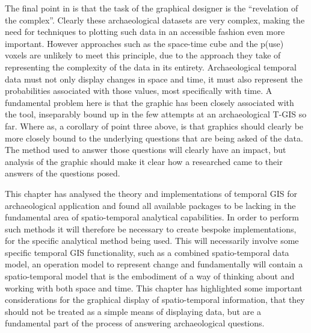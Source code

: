 The final point in \citet[191]{tufte1983visual} is that the task of the graphical designer is the ``revelation of the complex''. Clearly these archaeological datasets are very complex, making the need for techniques to plotting such data in an accessible fashion even more important. However approaches such as the space-time cube and the p(use) voxels are unlikely to meet this principle, due to the approach they take of representing the complexity of the data in its entirety. Archaeological temporal data must not only display changes in space and time, it must also represent the probabilities associated with those values, most specifically with time. A fundamental problem here is that the graphic has been closely associated with the tool, inseparably bound up in the few attempts at an archaeological T-GIS so far. Where as, a corollary of point three above, is that graphics should clearly be more closely bound to the underlying questions that are being asked of the data. The method used to answer those questions will clearly have an impact, but analysis of the graphic should make it clear how a researched came to their answers of the questions posed. 

This chapter has analysed the theory and implementations of temporal GIS for archaeological application and found all available packages to be lacking in the fundamental area of spatio-temporal analytical capabilities. In order to perform such methods it will therefore be necessary to create bespoke implementations, for the specific analytical method being used. This will necessarily involve some specific temporal GIS functionality, such as a combined spatio-temporal data model, an operation model to represent change and fundamentally will contain a spatio-temporal model that is the embodiment of a way of thinking about and working with both space and time. This chapter has highlighted some important considerations for the graphical display of spatio-temporal information, that they should not be treated as a simple means of displaying data, but are a fundamental part of the process of answering archaeological questions. 

